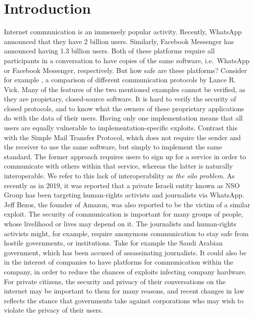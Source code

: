 \section{Introduction}
Internet communication is an immensely popular activity.
Recently, WhatsApp announced that they have 2 billion users\cite{whatsapp_2b_users_archive_org}.
Similarly, Facebook Messenger has announced having 1.3 billion users\cite{messenger_1pt3b_users}.
Both of these platforms require all participants in a conversation to have copies of the same software, i.e.~WhatsApp or Facebook Messenger, respectively.
But how safe are these platforms?
Consider for example \cite{twitter_comms_protocol_comparison}, a comparison of different communication protocols by Lance R. Vick.
Many of the features of the two mentioned examples cannot be verified, as they are propietary, closed-source software.
It is hard to verify the security of closed protocols, and to know what the owners of these proprietary applications do with the data of their users.
Having only one implementation means that all users are equally vulnerable to implementation-specific exploits.
Contrast this with the Simple Mail Transfer Protocol\cite{RFC5321}, which does not require the sender and the receiver to use the same software, but simply to implement the same standard.
The former approach requires users to sign up for a service in order to communicate with others within that service, whereas the latter is naturally interoperable.
We refer to this lack of interoperability as \textit{the silo problem}.
As recently as in 2019, it was reported that a private Israeli entity known as NSO Group has been targeting human-rights activists and journalists via WhatsApp\cite{nytimes_nso_group}.
Jeff Bezos, the founder of Amazon, was also reported to be the victim of a similar exploit\cite{nytimes_bezos_hack}.
The security of communication is important for many groups of people, whose livelihood or lives may depend on it.
The journalists and human-rights activists might, for example, require anonymous communication to stay safe from hostile governments, or institutions.
Take for example the Saudi Arabian government, which has been accused of assassinating journalists\cite{un_jamal_report}.
It could also be in the interest of companies to have platforms for communication within the company, in order to reduce the chances of exploits infecting company hardware.
For private citizens, the security and privacy of their conversations on the internet may be important to them for many reasons, and recent changes in law reflects the stance that governments take against corporations who may wish to violate the privacy of their users.

